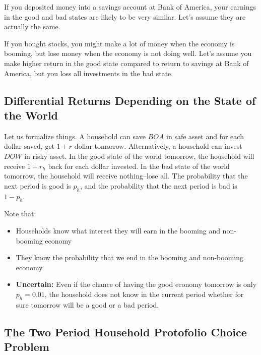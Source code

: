 \documentclass[
]{book}
\begin{document}
If you deposited money into a savings account at Bank of America, your
earnings in the good and bad states are likely to be very similar. Let's
assume they are actually the same.

If you bought stocks, you might make a lot of money when the economy is
booming, but lose money when the economy is not doing well. Let's assume
you make higher return in the good state compared to return to savings
at Bank of America, but you loss all investments in the bad state.

\hypertarget{differential-returns-depending-on-the-state-of-the-world}{%
\subsection{Differential Returns Depending on the State of the World}\label{differential-returns-depending-on-the-state-of-the-world}}

Let us formalize things. A household can save \(BOA\) in safe asset and
for each dollar saved, get \(1+r\) dollar tomorrow. Alternatively, a
household can invest \(DOW\) in risky asset. In the good state of the
world tomorrow, the household will receive \(1+r_h\) back for each dollar
invested. In the bad state of the world tomorrow, the household will
receive nothing--lose all. The probability that the next period is good
is \(p_h\), and the probability that the next period is bad is \(1-p_h\).

Note that:

\begin{itemize}
\item
  Households know what interest they will earn in the booming and
  non-booming economy
\item
  They know the probability that we end in the booming and non-booming
  economy
\item
  \textbf{Uncertain:} Even if the chance of having the good economy
  tomorrow is only \(p_h =0.01\), the household does not know in the
  current period whether for sure tomorrow will be a good or a bad
  period.
\end{itemize}

\hypertarget{the-two-period-household-protofolio-choice-problem}{%
\subsection{The Two Period Household Protofolio Choice Problem}\label{the-two-period-household-protofolio-choice-problem}}
\end{document}
